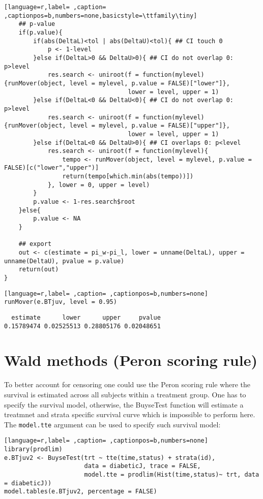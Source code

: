 \documentclass[12pt]{article}
\begin{document}
\begin{lstlisting}[language=r,label= ,caption= ,captionpos=b,numbers=none,basicstyle=\ttfamily\tiny]
    ## p-value
    if(p.value){
        if(abs(DeltaL)<tol | abs(DeltaU)<tol){ ## CI touch 0
            p <- 1-level
        }else if(DeltaL>0 && DeltaU>0){ ## CI do not overlap 0: p>level
            res.search <- uniroot(f = function(mylevel){runMover(object, level = mylevel, p.value = FALSE)["lower"]},
                                  lower = level, upper = 1)
        }else if(DeltaL<0 && DeltaU<0){ ## CI do not overlap 0: p>level
            res.search <- uniroot(f = function(mylevel){runMover(object, level = mylevel, p.value = FALSE)["upper"]},
                                  lower = level, upper = 1)
        }else if(DeltaL<0 && DeltaU>0){ ## CI overlaps 0: p<level
            res.search <- uniroot(f = function(mylevel){
                tempo <- runMover(object, level = mylevel, p.value = FALSE)[c("lower","upper")]
                return(tempo[which.min(abs(tempo))])
            }, lower = 0, upper = level)
        }
        p.value <- 1-res.search$root            
    }else{
        p.value <- NA
    }

    ## export
    out <- c(estimate = pi_w-pi_l, lower = unname(DeltaL), upper = unname(DeltaU), pvalue = p.value)
    return(out)
}
\end{lstlisting}


\begin{lstlisting}[language=r,label= ,caption= ,captionpos=b,numbers=none]
runMover(e.BTjuv, level = 0.95)
\end{lstlisting}
\begin{verbatim}
  estimate      lower      upper     pvalue 
0.15789474 0.02525513 0.28805176 0.02048651
\end{verbatim}



\clearpage

\section{Wald methods (Peron scoring rule)}
\label{sec:org20ae582}

To better account for censoring one could use the Peron scoring rule
where the survival is estimated across all subjects within a treatment
group. One has to specify the survival model, otherwise, the BuyseTest
function will estimate a treatmnet and strata specific survival curve
which is impossible to perform here. The \texttt{model.tte} argument can be
used to specify such survival model:
\begin{lstlisting}[language=r,label= ,caption= ,captionpos=b,numbers=none]
library(prodlim)
e.BTjuv2 <- BuyseTest(trt ~ tte(time,status) + strata(id), 
                      data = diabeticJ, trace = FALSE,
                      model.tte = prodlim(Hist(time,status)~ trt, data = diabeticJ))
model.tables(e.BTjuv2, percentage = FALSE)
\end{lstlisting}
\end{document}
